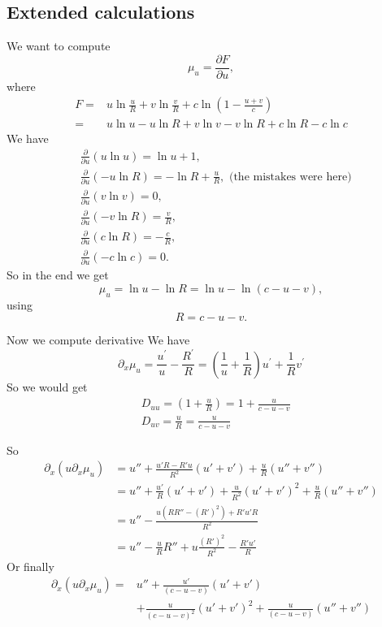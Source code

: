\documentclass{article}
\begin{document}
	\subsection{Extended calculations}
		We want to compute
	\begin{equation}\label{chemical-potential}
		\mu_{u}=\frac{\partial F}{\partial u},
	\end{equation}
where 
\begin{align}
	F=&u\ln\frac{u}{R}+v\ln\frac{v}{R}+c\ln\left(1-\frac{u+v}{c}\right)\\
	=&u\ln u-u\ln R+v\ln v-v\ln R+c\ln R - c \ln c
\end{align}
We have 
\begin{align*} 
	&\frac{\partial}{\partial u}\left(u \ln u\right) = \ln u + 1, \\ 
	&\frac{\partial}{\partial u}\left(-u \ln R\right) = -\ln R + \frac{u}{R},  \text{ (the mistakes were here)}\\ 
	&\frac{\partial}{\partial u}\left(v \ln v\right) = 0, \\ 
	&\frac{\partial}{\partial u}\left(-v \ln R\right) = \frac{v}{R}, \\ &\frac{\partial}{\partial u}\left(c \ln R\right) = -\frac{c}{R}, \\ &\frac{\partial}{\partial u}\left(-c \ln c\right) = 0. 
\end{align*} 
So in the end we get
\begin{equation}
	\mu_u = \ln u -\ln R = \ln u - \ln (c-u-v),
	\end{equation}	
	using 
	\begin{equation}
	R = c-u-v.
	\end{equation}

Now we compute derivative
We have
\begin{equation}
\partial_{x}\mu_{u}=\frac{u^{\prime}}{u}-\frac{R^{\prime}}{R}=\left(\frac{1}{u}+\frac{1}{R}\right)u^{\prime}+\frac{1}{R}v^{\prime}
\end{equation}
So we would get 
\begin{align}
&D_{uu}=(1+\frac{u}{R})=1+\frac{u}{c-u-v}\\
&D_{uv}=\frac{u}{R}=\frac{u}{c-u-v}
\end{align}

So 
\begin{align}\partial_x( u \partial_x \mu_u) &=u''+ \frac{u'R-R'u}{R^2}(u'+v')+\frac{u}{R}(u''+v'')\\
&=u''+\frac{u'}{R}(u'+v')+\frac{u}{R^2}(u'+v')^2+\frac{u}{R}(u''+v'')\\&=
u''-\frac{u(RR''-(R')^2)+R'u'R}{R^2}\\
&=u'' - \frac{u}{R}R'' + u\frac{(R')^2}{R^2}-\frac{R'u'}{R}
\end{align}
Or finally
\begin{align}
\partial_x( u \partial_x \mu_u)=&u''+\frac{u'}{(c-u-v)}(u'+v')\\&+\frac{u}{(c-u-v)^2}(u'+v')^2+\frac{u}{(c-u-v)}(u''+v'')\label{eq:laplacian}
\end{align}
\end{document}
